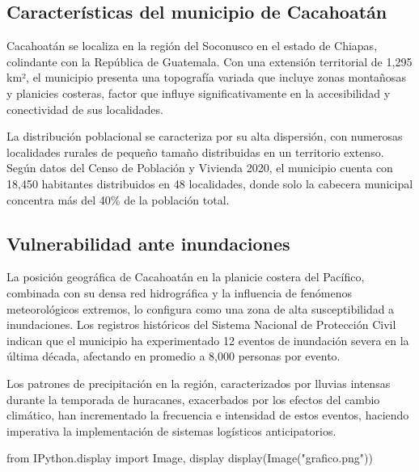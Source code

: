 \documentclass[
  spanish,
  us-letterpaper,
]{scrreprt}
\newenvironment{Shaded}{\begin{snugshade}}{\end{snugshade}}
\newcommand{\ImportTok}[1]{\textcolor[rgb]{0.00,0.46,0.62}{#1}}
\newcommand{\NormalTok}[1]{\textcolor[rgb]{0.00,0.23,0.31}{#1}}
\newcommand{\StringTok}[1]{\textcolor[rgb]{0.13,0.47,0.30}{#1}}
\numberwithin{equation}{chapter} %
\begin{document}
\subsection{Características del municipio de
Cacahoatán}\label{caracteruxedsticas-del-municipio-de-cacahoatuxe1n}

Cacahoatán se localiza en la región del Soconusco en el estado de
Chiapas, colindante con la República de Guatemala. Con una extensión
territorial de 1,295 km², el municipio presenta una topografía variada
que incluye zonas montañosas y planicies costeras, factor que influye
significativamente en la accesibilidad y conectividad de sus
localidades.

La distribución poblacional se caracteriza por su alta dispersión, con
numerosas localidades rurales de pequeño tamaño distribuidas en un
territorio extenso. Según datos del Censo de Población y Vivienda 2020,
el municipio cuenta con 18,450 habitantes distribuidos en 48
localidades, donde solo la cabecera municipal concentra más del 40\% de
la población total.

\subsection{Vulnerabilidad ante
inundaciones}\label{vulnerabilidad-ante-inundaciones}

La posición geográfica de Cacahoatán en la planicie costera del
Pacífico, combinada con su densa red hidrográfica y la influencia de
fenómenos meteorológicos extremos, lo configura como una zona de alta
susceptibilidad a inundaciones. Los registros históricos del Sistema
Nacional de Protección Civil indican que el municipio ha experimentado
12 eventos de inundación severa en la última década, afectando en
promedio a 8,000 personas por evento.

Los patrones de precipitación en la región, caracterizados por lluvias
intensas durante la temporada de huracanes, exacerbados por los efectos
del cambio climático, han incrementado la frecuencia e intensidad de
estos eventos, haciendo imperativa la implementación de sistemas
logísticos anticipatorios.

\begin{Shaded}
\begin{Highlighting}[]
\ImportTok{from}\NormalTok{ IPython.display }\ImportTok{import}\NormalTok{ Image, display}
\NormalTok{display(Image(}\StringTok{"grafico.png"}\NormalTok{))}
\end{Highlighting}
\end{Shaded}
\end{document}
